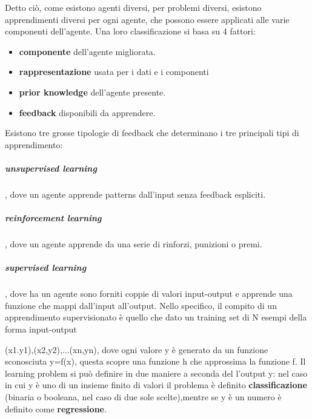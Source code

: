\documentclass[14pt]{extarticle}
\begin{document}
Detto ciò, come esistono agenti diversi, per problemi diversi, esistono apprendimenti diversi per ogni agente, che possono essere applicati alle varie componenti dell'agente.
Una loro classificazione si basa su 4 fattori:
\begin{itemize}
\item \textbf{componente} dell'agente migliorata.
\item \textbf{rappresentazione} usata per i dati e i componenti
\item \textbf{prior knowledge} dell'agente presente.
\item \textbf{feedback}  disponibili da apprendere. 
\end{itemize} 

Esistono tre grosse tipologie di feedback che determinano i tre principali tipi di apprendimento:
\subparagraph{unsupervised learning}, dove un agente apprende patterns dall'input senza feedback espliciti. 

\subparagraph{reinforcement learning}, dove un agente apprende da una serie di rinforzi, punizioni o premi.
\subparagraph{supervised learning}, dove ha un agente sono forniti coppie di valori input-output e apprende una funzione che mappi dall'input all'output. 
Nello specifico, il compito di un apprendimento supervisionato è quello che dato un training set di N esempi della forma input-output

(x1.y1),(x2,y2),...(xn,yn),
dove ogni valore y è generato da un funzione sconosciuta y=f(x), questa scopre una funzione h che approssima la funzione f.  
Il learning problem si può definire in due maniere a seconda del l'output y: nel caso in cui  y è uno di  un insieme finito di valori il problema è definito  \textbf{classificazione} (binaria o booleana, nel caso di due sole scelte),mentre se y è un numero
 è definito come \textbf{regressione}.
 
\end{document}
